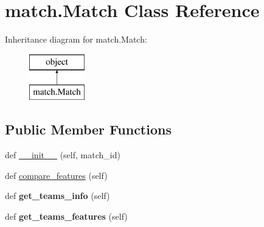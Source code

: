 \hypertarget{classmatch_1_1_match}{}\section{match.\+Match Class Reference}
\label{classmatch_1_1_match}
Inheritance diagram for match.\+Match\+:\begin{figure}[H]
\begin{center}
\leavevmode
\includegraphics[height=2.000000cm]{classmatch_1_1_match}
\end{center}
\end{figure}
\subsection*{Public Member Functions}
\begin{DoxyCompactItemize}
\item 
def \hyperlink{classmatch_1_1_match_ab239e1d39b715e0f4a1e42ca04167baf}{\+\_\+\+\_\+init\+\_\+\+\_\+} (self, match\+\_\+id)
\item 
def \hyperlink{classmatch_1_1_match_a33c1e9af19bf97b7524d5e5c42d1091f}{compare\+\_\+features} (self)
\item 
def {\bfseries get\+\_\+teams\+\_\+info} (self)\hypertarget{classmatch_1_1_match_a7be5ae37fc2ddd3a049498845bbe02db}{}\label{classmatch_1_1_match_a7be5ae37fc2ddd3a049498845bbe02db}

\item 
def {\bfseries get\+\_\+teams\+\_\+features} (self)\hypertarget{classmatch_1_1_match_ab54e9ac8ac097926a253ecb60d1a8b46}{}\label{classmatch_1_1_match_ab54e9ac8ac097926a253ecb60d1a8b46}

\end{DoxyCompactItemize}
